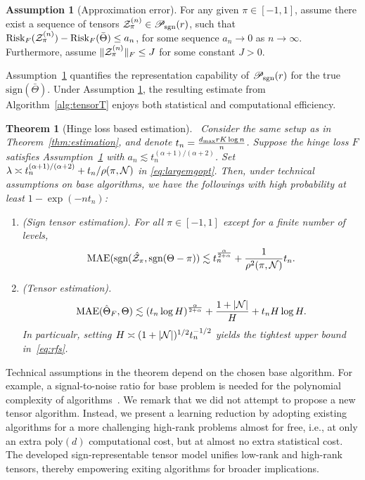 \documentclass[twoside,11pt]{article}
\theoremstyle{plain}
\newtheorem{thm}{Theorem}
\theoremstyle{definition}
\newtheorem{assumption}{Assumption}
\def\sign{\textup{sgn}}
\def\caliP{\mathscr{P}_{\textup{sgn}}}
\def\risk{\textup{Risk}}
\begin{document}
\begin{assumption}[Approximation error]\label{ass:loss} 
 For any given $\pi\in[-1,1]$, assume there exist a sequence of tensors $\tZ^{(n)}_\pi\in\caliP(r)
$, such that $\risk_F(\tZ^{(n)}_\pi)-\risk_F(\bar\Theta)\leq a_n$, for some sequence $a_n\to 0$ as $n\to\infty$. Furthermore, assume $\lVert\mathcal{Z}_{\pi}^{(n)}\rVert_F \leq J$ for some constant $J>0$. 
\end{assumption}


Assumption~\ref{ass:loss} quantifies the representation capability of $\caliP(r)$ for the true $\text{sign}(\bar\Theta)$.  Under Assumption \ref{ass:loss},  the resulting estimate from Algorithm~\ref{alg:tensorT} enjoys both statistical and computational efficiency. 
\begin{thm}[Hinge loss based estimation]~\label{thm:extension} 
Consider the same setup as in Theorem~\ref{thm:estimation}, and denote $ t_n={d_{\max}rK\log n \over n}$. Suppose the hinge loss $F$ satisfies Assumption~\ref{ass:loss} with $a_n \lesssim t_n^{(\alpha+1)/(\alpha+2)}$. Set $\lambda\asymp t_n^{(\alpha+1)/(\alpha+2)}+t_n/\rho(\pi,\mathcal{N})$ in \eqref{eq:largemgopt}. Then, under technical assumptions on base algorithms,  we have the followings with high probability at least $1-\exp(-nt_n)$:
\begin{enumerate}[label=(\alph*)]
\item (Sign tensor estimation). For all $\pi\in[-1,1]$ except for a finite number of levels,
\begin{equation}\label{eq:sfe}
\textup{MAE}(\sign(\hat \tZ_\pi,\sign(\Theta-\pi)) \lesssim t_n ^{\alpha\over 2+\alpha}+{1\over \rho^2(\pi,\tN)}t_n.
\end{equation}


\item (Tensor estimation). 
\begin{equation}\label{eq:rfs}
\textup{MAE}(\hat\Theta_F,\Theta) \lesssim  \left(t_n\log H\right)^{\alpha \over 2+\alpha}+\frac{1+|\mathcal{N}|}{H}+t_nH\log H.
\end{equation}
In particualr, setting $H\asymp(1+|\mathcal{N}|)^{1/2} t_n^{-1/2}$ yields the tightest upper bound in~\eqref{eq:rfs}.
\end{enumerate}
\end{thm}

Technical assumptions in the theorem
depend on the chosen base algorithm. For example, a signal-to-noise ratio for base problem is needed
for the polynomial complexity of algorithms~\citep{wang2018learning,han2020optimal}. We remark that we did not attempt to propose
a new tensor algorithm. Instead, we present a learning reduction by adopting existing algorithms for a
more challenging high-rank problems almost for free, i.e., at only an extra $\text{poly}(d)$ computational cost,
but at almost no extra statistical cost. The developed sign-representable tensor model unifies low-rank
and high-rank tensors, thereby empowering exiting algorithms for broader implications.
\end{document}
